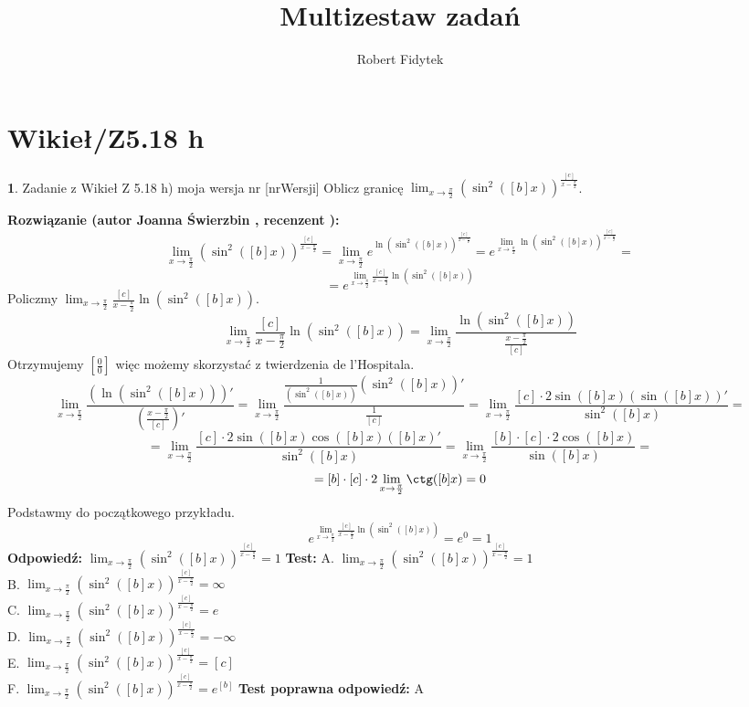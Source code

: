 \documentclass[12pt, a4paper]{article}
\title{Multizestaw zadań}
\author{Robert Fidytek}
\date{}
\theoremstyle{definition} %
\newtheorem{zad}{}
\newcommand{\kategoria}[1]{\section{#1}} %
\newcommand{\zadStart}[1]{\begin{zad}#1\newline} %
\newcommand{\zadStop}{\end{zad}}   %
\newcommand{\rozwStart}[2]{\noindent \textbf{Rozwiązanie (autor #1 , recenzent #2): }\newline} %
\newcommand{\rozwStop}{\newline}                                            %
\newcommand{\odpStart}{\noindent \textbf{Odpowiedź:}\newline}    %
\newcommand{\odpStop}{\newline}                                             %
\newcommand{\testStart}{\noindent \textbf{Test:}\newline} %
\newcommand{\testStop}{\newline} %
\newcommand{\kluczStart}{\noindent \textbf{Test poprawna odpowiedź:}\newline} %
\newcommand{\kluczStop}{\newline} %
\begin{document}
\maketitle


\kategoria{Wikieł/Z5.18 h}
\zadStart{Zadanie z Wikieł Z 5.18 h) moja wersja nr [nrWersji]}
Oblicz granicę $\lim_{x \rightarrow \frac{\pi}{2}} \left(\sin^2([b]x) \right)^{\frac{[c]}{x-\frac{\pi}{2}}}$.
\zadStop
\rozwStart{Joanna Świerzbin}{}
$$ \lim_{x \rightarrow \frac{\pi}{2}} \left(\sin^2([b]x) \right)^{\frac{[c]}{x-\frac{\pi}{2}}}= \lim_{x \rightarrow \frac{\pi}{2}} e^{\ln{\left(\sin^2([b]x) \right)^{\frac{[c]}{x-\frac{\pi}{2}}}}}=e^{\lim_{x \rightarrow \frac{\pi}{2}}{\ln{\left(\sin^2([b]x) \right)^{\frac{[c]}{x-\frac{\pi}{2}}}}}}=$$
$$=e^{\lim_{x \rightarrow \frac{\pi}{2}}{\frac{[c]}{x-\frac{\pi}{2}}}{\ln{\left(\sin^2([b]x) \right)}}}$$
Policzmy $ \lim_{x \rightarrow \frac{\pi}{2}}{\frac{[c]}{x-\frac{\pi}{2}}}{\ln{\left(\sin^2([b]x) \right)}}$.
$$\lim_{x \rightarrow \frac{\pi}{2}}{\frac{[c]}{x-\frac{\pi}{2}}}{\ln{\left(\sin^2([b]x) \right)}}=\lim_{x \rightarrow \frac{\pi}{2}}\frac{\ln{\left(\sin^2([b]x) \right)}}{{\frac{x-\frac{\pi}{2}}{[c]}}}$$
Otrzymujemy $ \left[ \frac{0}{0} \right] $ więc możemy skorzystać z twierdzenia de l'Hospitala.
$$\lim_{x \rightarrow \frac{\pi}{2}}\frac{\left(\ln{\left(\sin^2([b]x) \right)}\right)'}{\left({\frac{x-\frac{\pi}{2}}{[c]}}\right)'} = \lim_{x \rightarrow \frac{\pi}{2}}\frac{\frac{1}{\left(\sin^2([b]x) \right)}\left( \sin^2([b]x) \right)'}{{\frac{1}{[c]}}} = \lim_{x \rightarrow \frac{\pi}{2}}\frac{[c] \cdot 2 \sin([b]x)(\sin([b]x))'}{\sin^2([b]x)}=$$
$$= \lim_{x \rightarrow \frac{\pi}{2}}\frac{[c] \cdot 2 \sin([b]x) \cos([b]x) ([b]x)'}{\sin^2([b]x)}= \lim_{x \rightarrow \frac{\pi}{2}}\frac{[b]\cdot[c] \cdot 2 \cos([b]x)}{\sin([b]x)}=$$ $$ =[b]\cdot[c] \cdot 2 \lim_{x \rightarrow \frac{\pi}{2}}\ctg([b]x) = 0$$
Podstawmy do początkowego przykładu.
$$e^{\lim_{x \rightarrow \frac{\pi}{2}}{\frac{[c]}{x-\frac{\pi}{2}}}{\ln{\left(\sin^2([b]x) \right)}}} = e^{0} =1 $$
\rozwStop
\odpStart
$\lim_{x \rightarrow \frac{\pi}{2}} \left(\sin^2([b]x) \right)^{\frac{[c]}{x-\frac{\pi}{2}}} = 1$
\odpStop
\testStart
A. $\lim_{x \rightarrow \frac{\pi}{2}} \left(\sin^2([b]x) \right)^{\frac{[c]}{x-\frac{\pi}{2}}} = 1$\\
B. $\lim_{x \rightarrow \frac{\pi}{2}} \left(\sin^2([b]x) \right)^{\frac{[c]}{x-\frac{\pi}{2}}} = \infty$\\
C. $\lim_{x \rightarrow \frac{\pi}{2}} \left(\sin^2([b]x) \right)^{\frac{[c]}{x-\frac{\pi}{2}}} = e$\\
D. $\lim_{x \rightarrow \frac{\pi}{2}} \left(\sin^2([b]x) \right)^{\frac{[c]}{x-\frac{\pi}{2}}} = -\infty$\\
E. $\lim_{x \rightarrow \frac{\pi}{2}} \left(\sin^2([b]x) \right)^{\frac{[c]}{x-\frac{\pi}{2}}} = [c]$\\
F. $\lim_{x \rightarrow \frac{\pi}{2}} \left(\sin^2([b]x) \right)^{\frac{[c]}{x-\frac{\pi}{2}}} = e^{[b]}$
\testStop
\kluczStart
A
\kluczStop
\end{document}
